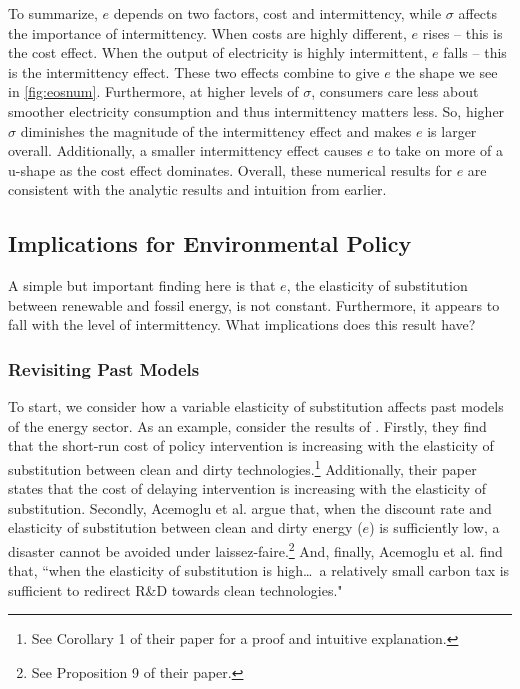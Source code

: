 \documentclass[11pt,a4paper,leqno]{extarticle}
\begin{document}
	
	To summarize, $e$ depends on two factors, cost and intermittency, while $\sigma$ affects the importance of intermittency. When costs are highly different, $e$ rises -- this is the cost effect. When the output of electricity is highly intermittent, $e$ falls -- this is the intermittency effect. These two effects combine to give $e$ the shape we see in \autoref{fig:eosnum}. Furthermore, at higher levels of $\sigma$, consumers care less about smoother electricity consumption and thus intermittency matters less. So, higher $\sigma$ diminishes the magnitude of the intermittency effect and makes  $e$ is larger overall. Additionally, a smaller intermittency effect causes  $e$ to take on more of a u-shape as the cost effect dominates. Overall, these numerical results for $e$ are consistent with the analytic results and intuition from earlier. 
	

	
	
	\subsection{Implications for Environmental Policy}
	
	A simple but important finding here is that $e$, the elasticity of substitution between  renewable and fossil energy, is not constant. Furthermore, it appears to fall with the level of intermittency. What implications does this result have?
	
	\subsubsection{Revisiting Past Models}
	
	To start, we consider how  a variable elasticity of substitution affects past models of the energy sector. As an example, consider the results of \citet{Ace2012}. Firstly, they find that the short-run cost of policy intervention is increasing with the elasticity of substitution between clean and dirty technologies.\footnote{ See Corollary 1 of their paper for a proof and intuitive explanation.} Additionally, their paper states that the cost of delaying intervention is increasing with the elasticity of substitution. Secondly, Acemoglu et al. argue that, when the discount rate and elasticity of substitution between clean and dirty energy ($e$) is sufficiently low, a disaster cannot be avoided under laissez-faire.\footnote{ See Proposition 9 of their paper.} And, finally, Acemoglu et al. find that, ``when the elasticity of substitution is high\dots\, a relatively small carbon tax is sufficient to redirect R\&D towards clean technologies."
	
\end{document}
